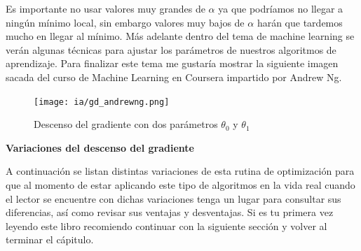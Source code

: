 \documentclass[11pt,fleqn]{book} %
\begin{document}
Es importante no usar valores muy grandes de $\alpha$ ya que podríamos no llegar a ningún mínimo local, sin embargo valores muy bajos de $\alpha$ harán que tardemos mucho en llegar al mínimo. Más adelante dentro del tema de machine learning se verán algunas técnicas para ajustar los parámetros de nuestros algoritmos de aprendizaje. Para finalizar este tema me gustaría mostrar la siguiente imagen sacada del curso de Machine Learning en Coursera impartido por Andrew Ng.

\begin{figure}[ht]
\centering\texttt{[image: ia/gd\_andrewng.png]}
\caption{Descenso del gradiente con dos parámetros $\theta_0$ y $\theta_1$}

\label{fig:cost_function_der_two_params} 
\end{figure}

\textbf{Variaciones del descenso del gradiente}

A continuación se listan distintas variaciones de esta rutina de optimización para que al momento de estar aplicando este tipo de algoritmos en la vida real cuando el lector se encuentre con dichas variaciones tenga un lugar para consultar sus diferencias, así como revisar sus ventajas y desventajas. Si es tu primera vez leyendo este libro recomiendo continuar con la siguiente sección y volver al terminar el cápitulo.
\end{document}
